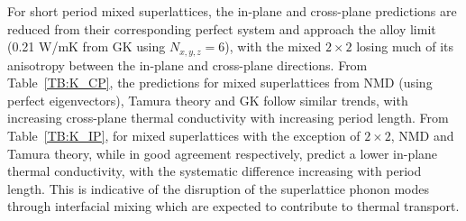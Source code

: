 For short period mixed superlattices, the in-plane and cross-plane predictions are reduced from their corresponding perfect system and approach the alloy limit (0.21 W/mK from GK using $N_{x,y,z}=6$), with the mixed $2\times 2$ losing much of its anisotropy between the in-plane and cross-plane directions. From Table~\ref{TB:K_CP}, the predictions for mixed superlattices from NMD (using perfect eigenvectors), Tamura theory and GK follow similar trends, with increasing cross-plane thermal conductivity with increasing period length. From Table~\ref{TB:K_IP}, for mixed superlattices with the exception of $2 \times 2$, NMD and Tamura theory, while in good agreement respectively,  predict a lower in-plane thermal conductivity, with the systematic difference increasing with period length. This is indicative of the disruption of the superlattice phonon modes through interfacial mixing which are expected to contribute to thermal transport. 
\begin{comment}
\begin{table}
\begin{center}
\begin{tabular}{lcc}
\hline\hline\noalign{\smallskip}
&\multicolumn{2}{c}{Method} \\
\cline{2-3}\noalign{\smallskip}
$k$ & NMD  & GK  \\
\noalign{\smallskip}\hline\noalign{\smallskip}
Cross-Plane Perfect  & 0.24 $\pm$ 0.02 & 0.22 $\pm$ 0.04\\
Cross-Plane 80/20    & 0.17  $\pm$ 0.01   &   0.18 $\pm$ 0.02 \\
Cross-Plane 60/40    & 0.18  $\pm$ 0.01   &   0.19 $\pm$ 0.02 \\
In-Plane Perfect   & 0.52 $\pm$ 0.03 & 0.54 $\pm$ 0.03  \\
In-Plane 80/20  & 0.25 $\pm$ 0.02 & 0.30 $\pm$ 0.01  \\
In-Plane 60/40   & 0.20 $\pm$ 0.02 & 0.26 $\pm$ 0.01  \\
\noalign{\smallskip}\hline\hline
\end{tabular}
\end{center}
\renewcommand{\table}{Table.}
\caption{A comparison of the thermal conductivity predictions [$Wm^{-1}K^{-1}$] predictions for a $4\times4$ superlattice.}
\label{TB:validate}
\end{table}
\end{comment}
